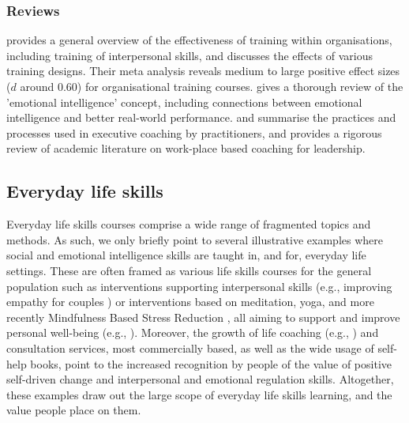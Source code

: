 \documentclass[prodmode,acmtochi]{acmsmall}
\newcommand{\GeraldineFIX}[1]{}
\begin{document}
\GeraldineFIX{G: Not just for executives though in the workplace - this can sound like it is only for execs?    P: That's what the reviews I found focused on ... perhaps still mainly used for execs, as very expensive to roll-out more widely? Or perhaps not that much literature on it?}

\subsubsection*{Reviews}   provides a general overview of the effectiveness of training within organisations, including training of interpersonal skills, and discusses the effects of various training designs. Their meta analysis reveals medium to large positive effect sizes  ($d$ around $0.60$) for organisational training courses.  gives a thorough review of the 'emotional intelligence' concept, including connections between emotional intelligence and better real-world performance.    and  summarise the practices and processes used in executive coaching by practitioners, and  provides a rigorous review of academic literature on work-place based coaching for leadership. \GeraldineFIX{G: ??? seeing you also mention coaching under the personal area?? ... P: But this review really does talk about work-place only, with particular focus on leadership}

\subsection{Everyday life skills}
Everyday life skills courses comprise a wide range of fragmented topics and methods. As such, we only briefly point to several illustrative examples where social and emotional intelligence skills are taught in, and for, everyday life settings. These are often framed as  various life skills courses  for the general population such as interventions supporting interpersonal skills (e.g., improving empathy for couples \cite{Long1999,Angera2006}) or interventions based on meditation, yoga, and more recently Mindfulness Based Stress Reduction \cite{Kabat-Zinn2003}, all aiming to support and improve personal well-being (e.g., \cite{Grossman2004,Marchand2012}).  %
Moreover, the growth of life coaching (e.g., \cite{Green2006})  and consultation services, most commercially based, as well as the wide usage of self-help books, point to the increased recognition by people of the value of positive self-driven change and interpersonal and emotional regulation skills. 
%
Altogether, these examples draw out the large scope of everyday life skills learning, and the value people place on them.
\end{document}
